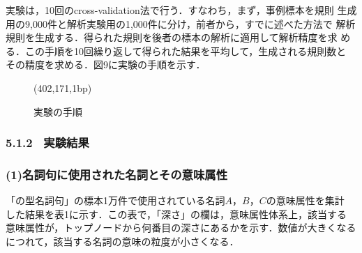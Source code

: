 実験は，10回のcross-validation法で行う．すなわち，まず，事例標本を規則
生成用の9,000件と解析実験用の1,000件に分け，前者から，すでに述べた方法で
解析規則を生成する．得られた規則を後者の標本の解析に適用して解析精度を求
める．この手順を10回繰り返して得られた結果を平均して，生成される規則数と
その精度を求める．図9に実験の手順を示す．
\vspace*{-2mm}
\begin{figure}[thb]
\begin{center}
\begin{epsf}
\end{epsf}
\begin{draft}
\atari(402,171,1bp)
\end{draft}
\end{center}
\vspace*{-4mm}
\caption{実験の手順}
\label{fig:実験の手順}
\end{figure}
\subsubsection{5.1.2 \ 実験結果}
\subsubsection*{(1)名詞句に使用された名詞とその意味属性}
「の型名詞句」の標本1万件で使用されている名詞$A，B，C$の意味属性を集計
した結果を表1に示す．この表で，「深さ」の欄は，意味属性体系上，該当する
意味属性が，トップノードから何番目の深さにあるかを示す．数値が大きくなる
につれて，該当する名詞の意味の粒度が小さくなる．

